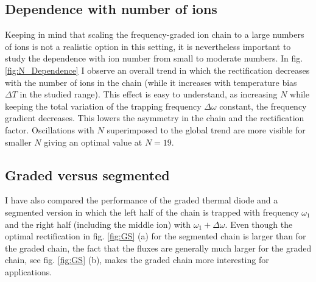 \subsection{Dependence with number of ions\label{IN}}
%
Keeping in mind that scaling the frequency-graded ion chain  to a large numbers of ions is not a realistic option in this setting,
it is nevertheless important to
study the dependence with ion number from small to moderate numbers.  In fig. \ref{fig:N_Dependence} I observe an overall trend in which the rectification decreases with the number of ions in the chain (while it increases with temperature bias $\Delta T$ in the studied range). This effect is easy to understand, as increasing $N$
while keeping the total variation of the trapping frequency $\Delta \omega$ constant, the frequency gradient  decreases. This
lowers  the  asymmetry in the chain and the rectification factor. Oscillations with $N$ superimposed to the global trend are more visible for smaller $N$ giving  an optimal value at $N=19$.

\subsection{Graded versus segmented\label{GS}}
%
I have also compared the performance of the graded thermal diode and a segmented version in which the left half of the chain is trapped with frequency $\omega_1$ and the right half (including the middle ion) with $\omega_1+\Delta \omega$. Even though the optimal rectification  in fig. \ref{fig:GS} (a)  for the segmented chain is larger than for the graded chain, the fact that the fluxes are generally much larger for the graded chain, see fig. \ref{fig:GS} (b), makes the graded chain more interesting for applications.



